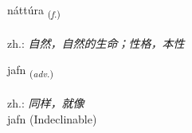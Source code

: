 \documentclass[frontgrid, backgrid]{flacards}\usepackage[]{graphicx}\usepackage[]{xcolor}
\begin{document}
\renewcommand{\blhead}{\vskip5pt {\small\bfseries\footnotesize Nafnorð | 名词 }}
\renewcommand{\bcfoot}{\vskip5pt \hspace{2pt}{\small\bfseries\footnotesize 1K}}


{náttúra \small{\textsubscript{(\textit{f.})}} \\[1ex] %
\textphonetic{[nauhtura]} \\
zh.: \emph{自然，自然的生命；性格，本性} \\  [2ex]
\renewcommand*{\arraystretch}{0.8}
}


\renewcommand{\flhead}{\vskip5pt \fboxsep=0pt {\small\bfseries\footnotesize Atviksorð | 副词}}
\renewcommand{\fcfoot}{\vskip5pt \fboxsep=0pt \hspace{2pt}{\small\bfseries\footnotesize 1K}}

\renewcommand{\blhead}{\vskip5pt {\small\bfseries\footnotesize Atviksorð | 副词 }}
\renewcommand{\bcfoot}{\vskip5pt \hspace{2pt}{\small\bfseries\footnotesize 1K}}


{jafn \small{\textsubscript{(\textit{adv.})}} \\[1ex]
\textphonetic{[japn̥]} \\
zh.: \emph{同样，就像} \\  [2ex]
jafn (Indeclinable)}


\renewcommand{\flhead}{\vskip5pt \fboxsep=0pt {\small\bfseries\footnotesize Samtenging | 连词}}
\renewcommand{\fcfoot}{\vskip5pt \fboxsep=0pt \hspace{2pt}{\small\bfseries\footnotesize 1K}}

\renewcommand{\blhead}{\vskip5pt {\small\bfseries\footnotesize Samtenging | 连词 }}
\renewcommand{\bcfoot}{\vskip5pt \hspace{2pt}{\small\bfseries\footnotesize 1K}}
\end{document}
